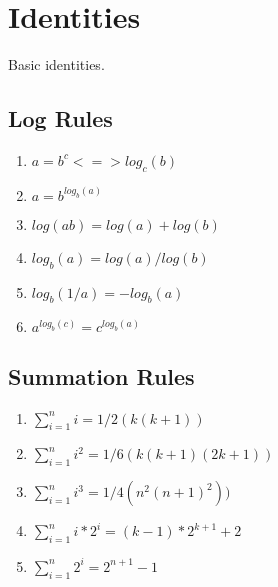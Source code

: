 \documentclass[7pt,twocolumn]{article}
\begin{document}

\section{ Identities }
Basic identities.
\subsection{ Log Rules }
\begin{enumerate}
    \item $a = b^c <=> log_c(b)$
    \item $a = b^{log_b(a)}$
    \item $log(a b) = log(a) + log(b)$
    \item $log_b(a) = log(a)/log(b)$
    \item $log_b(1/a) = -log_b(a)$
    \item $a^{log_b(c)} = c^{log_b(a)}$
    \end{enumerate}
\subsection{ Summation Rules}
\begin{enumerate}
    \item $\sum_{i = 1}^n i = 1/2(k(k+1))$
    \item $\sum_{i = 1}^n i^2 = 1/6(k(k+1)(2k+1))$
    \item $\sum_{i = 1}^n i^3 = 1/4(n^2 (n+1)^2))$
    \item $\sum_{i = 1}^n i * 2^i = (k-1) * 2^{k+1} + 2$
    \item $\sum_{i = 1}^n 2^i = 2^{n+1}-1$
\end{enumerate}
\end{document}
